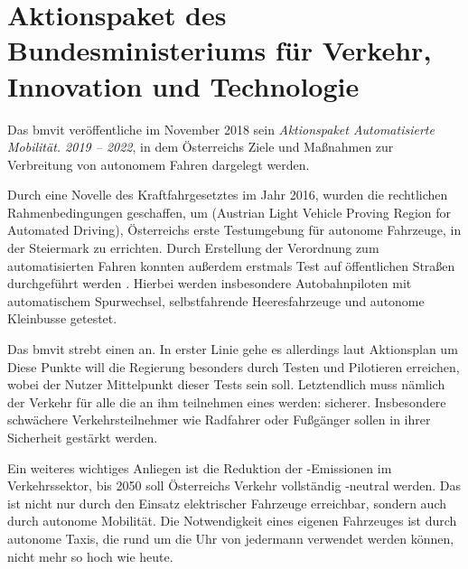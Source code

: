 \section{Aktionspaket des Bundesministeriums für Verkehr, Innovation und Technologie}

Das \ac{bmvit} veröffentliche im November 2018 sein \emph{Aktionspaket Automatisierte Mobilität. 2019 -- 2022}, in dem Österreichs Ziele und Maßnahmen zur Verbreitung von autonomem Fahren dargelegt werden.

Durch eine Novelle des Kraftfahrgesetztes im Jahr 2016, wurden die rechtlichen Rahmenbedingungen geschaffen, um  (Austrian Light Vehicle Proving Region for Automated Driving), Österreichs erste Testumgebung für autonome Fahrzeuge, in der Steiermark zu errichten. Durch Erstellung der Verordnung zum automatisierten Fahren konnten außerdem erstmals Test auf öffentlichen Straßen durchgeführt werden . Hierbei werden insbesondere Autobahnpiloten mit automatischem Spurwechsel, selbstfahrende Heeresfahrzeuge und autonome Kleinbusse getestet.

Das \ac{bmvit} strebt einen  an. In erster Linie gehe es allerdings laut Aktionsplan um  Diese Punkte will die Regierung besonders durch Testen und Pilotieren erreichen, wobei der Nutzer Mittelpunkt dieser Tests sein soll. Letztendlich muss nämlich der Verkehr für alle die an ihm teilnehmen eines werden: sicherer. Insbesondere schwächere Verkehrsteilnehmer wie Radfahrer oder Fußgänger sollen in ihrer Sicherheit gestärkt werden.

Ein weiteres wichtiges Anliegen ist die Reduktion der -Emissionen im Verkehrssektor, bis 2050 soll Österreichs Verkehr vollständig -neutral werden. Das ist nicht nur durch den Einsatz elektrischer Fahrzeuge erreichbar, sondern auch durch autonome Mobilität. Die Notwendigkeit eines eigenen Fahrzeuges ist durch autonome Taxis, die rund um die Uhr von jedermann verwendet werden können, nicht mehr so hoch wie heute.
